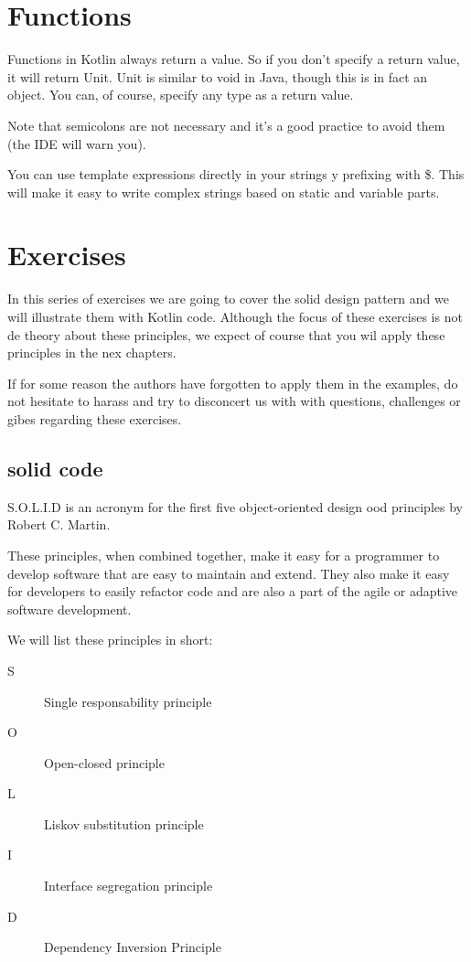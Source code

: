 \section{Functions}
Functions in Kotlin always return a value. So if you don’t specify a return value, it will return Unit.
Unit is similar to void in Java, though this is in fact an object. You can, of course,
specify any type as a return value.

Note that semicolons are not  necessary
and it’s a good practice to avoid them (the IDE will warn you).

You can use template expressions directly in your strings y prefixing with \$. This will make
it easy to write complex strings based on static and variable parts. 

\section{Exercises }
In this series of exercises we are going to cover the \gls{solid} design pattern and we will illustrate them with Kotlin code. Although the focus of these exercises is not de theory about these principles, we expect of course that you wil apply these principles in the nex chapters. 

If for some reason the authors  have forgotten to apply them in the examples, do not hesitate to  harass and try to disconcert us with with questions, challenges or gibes regarding these exercises. 


\subsection{\gls{solid} code}
S.O.L.I.D is an acronym for the first five object-oriented design \gls{ood} principles by Robert C. Martin.

These principles, when combined together, make it easy for a programmer to develop software that are easy to maintain and extend. They also make it easy for developers to easily refactor code and are also a part of the agile or adaptive software development.

We will list these principles in short:

\begin{description}
	\item[S] Single responsability principle
	\item[O] Open-closed principle
	\item[L] Liskov substitution principle
	\item[I] Interface segregation principle
	\item[D] Dependency Inversion Principle
\end{description}

